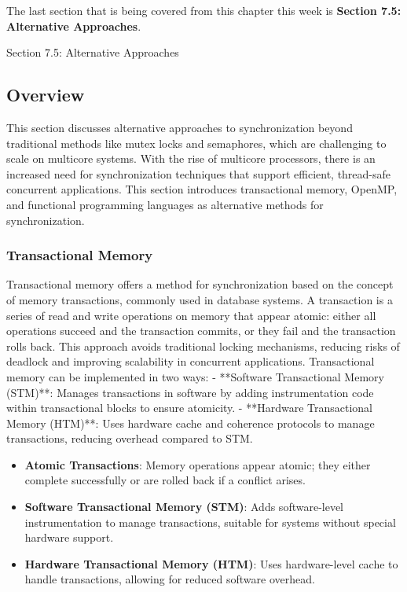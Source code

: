 The last section that is being covered from this chapter this week is \textbf{Section 7.5: Alternative Approaches}.

\begin{notes}{Section 7.5: Alternative Approaches}
    \subsection*{Overview}

    This section discusses alternative approaches to synchronization beyond traditional methods like mutex locks and semaphores, which are challenging to scale on multicore systems. With the rise of 
    multicore processors, there is an increased need for synchronization techniques that support efficient, thread-safe concurrent applications. This section introduces transactional memory, OpenMP,
    and functional programming languages as alternative methods for synchronization.
    
    \subsubsection*{Transactional Memory}
    
    Transactional memory offers a method for synchronization based on the concept of memory transactions, commonly used in database systems. A transaction is a series of read and write operations on 
    memory that appear atomic: either all operations succeed and the transaction commits, or they fail and the transaction rolls back. This approach avoids traditional locking mechanisms, reducing 
    risks of deadlock and improving scalability in concurrent applications. Transactional memory can be implemented in two ways:
        - **Software Transactional Memory (STM)**: Manages transactions in software by adding instrumentation code within transactional blocks to ensure atomicity.
        - **Hardware Transactional Memory (HTM)**: Uses hardware cache and coherence protocols to manage transactions, reducing overhead compared to STM.
    
    \begin{highlight}
    
        \begin{itemize}
            \item \textbf{Atomic Transactions}: Memory operations appear atomic; they either complete successfully or are rolled back if a conflict arises.
            \item \textbf{Software Transactional Memory (STM)}: Adds software-level instrumentation to manage transactions, suitable for systems without special hardware support.
            \item \textbf{Hardware Transactional Memory (HTM)}: Uses hardware-level cache to handle transactions, allowing for reduced software overhead.
        \end{itemize}
    

\end{highlight}
\end{notes}
